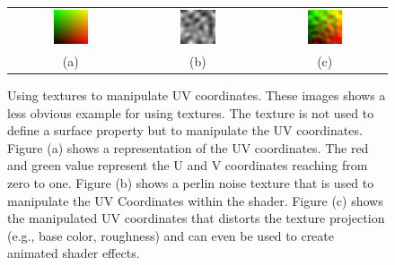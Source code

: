 	\begin{figure}
		\centering\small 
		\begin{tabular}{@{}ccc@{}}
			\includegraphics[width=0.3\textwidth]{images/02cha_01_TextureArrayOfData_uvCoordinates.jpg} &
			\includegraphics[width=0.3\textwidth]{images/02cha_02_TextureArrayOfData_Perlin_Noise.jpg} &
			\includegraphics[width=0.3\textwidth]{images/02cha_03_TextureArrayOfData_Modified_UVs.jpg} \\	
			(a) & (b) & (c) 
		\end{tabular}	

		\caption{Using textures to manipulate UV coordinates. These images shows a less obvious example for using textures. The texture is not used to define a surface property but to manipulate the UV coordinates. Figure (a) shows a representation of the UV coordinates. The red and green value represent the U and V coordinates reaching from zero to one. Figure (b) shows a perlin noise texture that is used to manipulate the UV Coordinates within the shader. Figure (c) shows the manipulated UV coordinates that distorts the texture projection (e.g., base color, roughness) and can even be used to create animated shader effects. }
		\label{fig:textureExample}
	\end{figure}

